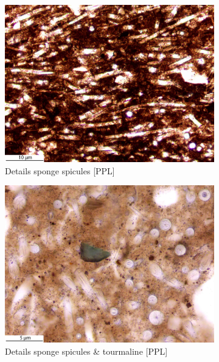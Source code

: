 \documentclass[a4paper]{article}
\begin{document}
\begin{figure}[H]
\begin{subfigure}[t]{.32\textwidth}
		\includegraphics[width=\textwidth]{ThinSections/17-5_20x_PPL.jpg}
		\caption{Details sponge spicules [PPL]}
	\end{subfigure}\hspace{.1em}\hfill
	\begin{subfigure}[t]{.32\textwidth}
		\includegraphics[width=\textwidth]{ThinSections/17-6_40x_PPL.jpg}
		\caption{Details sponge spicules \& tourmaline [PPL]}
	\end{subfigure}\hspace{.1em}\hfill
	\begin{subfigure}[t]{.32\textwidth}

\end{subfigure}
\end{figure}
\end{document}
